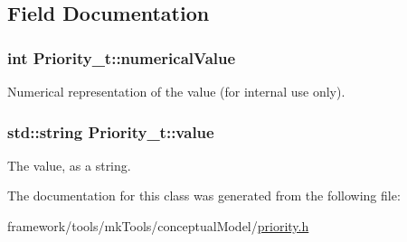 \subsection{Field Documentation}
\subsubsection[{\texorpdfstring{numerical\+Value}{numericalValue}}]{\setlength{\rightskip}{0pt plus 5cm}int Priority\+\_\+t\+::numerical\+Value\hspace{0.3cm}{\ttfamily [protected]}}\hypertarget{class_priority__t_ab27bd852b25c6e2e02468c2ed84648ea}{}\label{class_priority__t_ab27bd852b25c6e2e02468c2ed84648ea}


Numerical representation of the value (for internal use only). 

\subsubsection[{\texorpdfstring{value}{value}}]{\setlength{\rightskip}{0pt plus 5cm}std\+::string Priority\+\_\+t\+::value\hspace{0.3cm}{\ttfamily [protected]}}\hypertarget{class_priority__t_afd1c4aa37b795e472bed06e9b72aaa6e}{}\label{class_priority__t_afd1c4aa37b795e472bed06e9b72aaa6e}


The value, as a string. 



The documentation for this class was generated from the following file\+:\begin{DoxyCompactItemize}
\item 
framework/tools/mk\+Tools/conceptual\+Model/\hyperlink{priority_8h}{priority.\+h}\end{DoxyCompactItemize}
